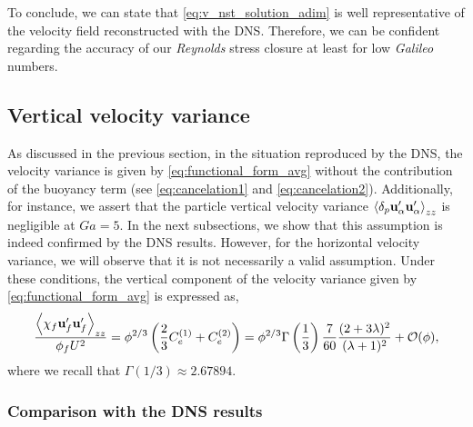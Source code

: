 To conclude, we can state that \ref{eq:v_nst_solution_adim} is well representative of the velocity field reconstructed with the DNS. 
Therefore, we can be confident regarding the accuracy of our \textit{Reynolds} stress closure at least for low \textit{Galileo} numbers. 




\subsection{Vertical velocity variance}

As discussed in the previous section, in the situation reproduced by the DNS, the velocity variance is given by \ref{eq:functional_form_avg} without the contribution of the buoyancy term (see \eqref{eq:cancelation1} and \ref{eq:cancelation2}). 
Additionally, for instance, we assert that the particle vertical velocity variance $\left<\delta_p \textbf{u}_\alpha'\textbf{u}_\alpha'\right>_{zz}$ is negligible  at  $Ga =5$. 
In the next subsections, we show that this assumption is indeed confirmed by the DNS results. 
However, for the horizontal velocity variance, we will observe that it is not necessarily a valid assumption. 
Under these conditions, the vertical component of the velocity variance given by \ref{eq:functional_form_avg} is expressed as, 
\begin{equation}
    \frac{\avg{\chi_f \textbf{u}_f'\textbf{u}_f'}_{zz}}{\phi_f U^2}
    = \phi^{2/3} \left(
        \frac{2}{3}C_e^{(1)}+ C_e^{(2)}
    \right)
    = 
    \phi^{2/3}\Gamma\left(\frac{1}{3}\right) \frac{7}{60}\frac{(2+3\lambda)^2 }{(\lambda+1)^2}
    + \mathcal{O}(\phi), 
    \label{eq:theoritical_simplified}
\end{equation}
where we recall that $\Gamma(1/3) \approx 2.67894$. 




\subsubsection{Comparison with the DNS results}

